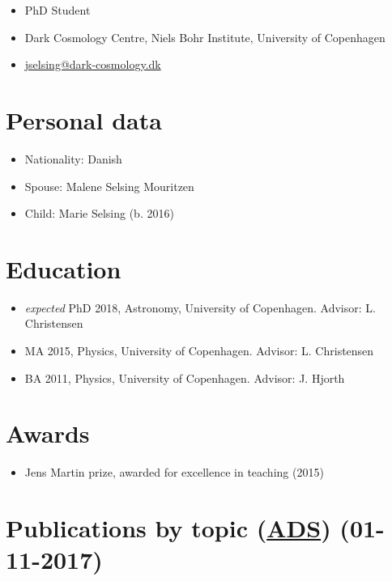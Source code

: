 \documentclass[12pt,letterpaper]{article}
\begin{document}
\thispagestyle{empty}\sloppy\sloppypar

{\huge \name}
\vspace{-0.25em}

\begin{itemize}
  \item PhD Student
  \item Dark Cosmology Centre, Niels Bohr Institute, University of Copenhagen
  \item \href{mailto:jselsing@dark-cosmology.dk}{jselsing@dark-cosmology.dk} 
\end{itemize}


\section*{Personal data}

\begin{itemize}
	\item Nationality: Danish
	\item Spouse: Malene Selsing Mouritzen
	\item Child: Marie Selsing (b. 2016)
	
\end{itemize}


\section*{Education}
	\begin{itemize}
	\item \textit{expected} PhD 2018, Astronomy, University of Copenhagen.
		{Advisor: L. Christensen}
	\item MA 2015, Physics, University of Copenhagen.
		{Advisor: L. Christensen}
	\item BA 2011, Physics, University of Copenhagen.
		{Advisor: J. Hjorth}
	\end{itemize}


\section*{Awards}

	\begin{itemize}
    \item Jens Martin prize, awarded for excellence in teaching (2015)
	\end{itemize}

\section*{Publications  by topic (\href{\adsurl}{ADS}) (01-11-2017)}
\end{document}
